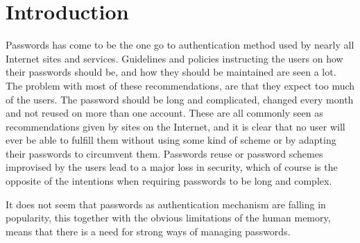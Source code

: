 \chapter{Introduction}
\label{chp:intro} 

Passwords has come to be the one go to authentication method used by nearly all Internet sites and services. Guidelines and policies instructing the users on how their passwords should be, and how they should be maintained are seen a lot. The problem with most of these recommendations, are that they expect too much of the users. The password should be long and complicated, changed every month and not reused on more than one account. These are all commonly seen as recommendations given by sites on the Internet, and it is clear that no user will ever be able to fulfill them without using some kind of scheme or by adapting their passwords to circumvent them. Passwords reuse or password schemes improvised by the users lead to a major loss in security, which of course is the opposite of the intentions when requiring passwords to be long and complex.  
\par It does not seem that passwords as authentication mechanism are falling in popularity, this together with the obvious limitations of the human memory, means that there is a need for strong ways of managing passwords. 


